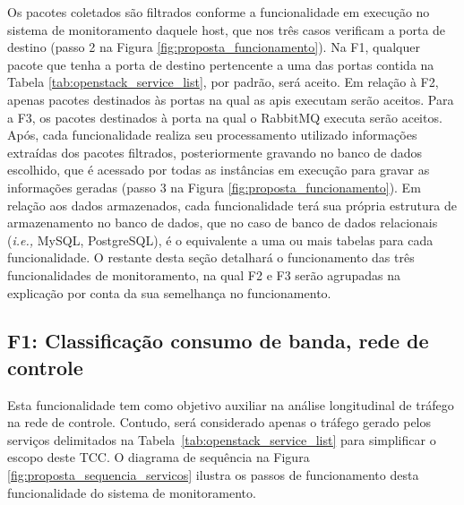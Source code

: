 Os pacotes coletados são filtrados conforme a funcionalidade em execução no sistema de monitoramento daquele host, que nos três casos verificam a porta de destino (passo 2 na Figura \ref{fig:proposta_funcionamento}).
%
Na F1, qualquer pacote que tenha a porta de destino pertencente a uma das portas contida na Tabela \ref{tab:openstack_service_list}, por padrão, será aceito.
%
Em relação à F2, apenas pacotes destinados às portas na qual as \acp{api} executam serão aceitos.
%
Para a F3, os pacotes destinados à porta na qual o RabbitMQ executa serão aceitos.
%
Após, cada funcionalidade realiza seu processamento utilizado informações extraídas dos pacotes filtrados, posteriormente gravando no banco de dados escolhido, que é acessado por todas as instâncias em execução para gravar as informações geradas (passo 3 na Figura \ref{fig:proposta_funcionamento}).
%
Em relação aos dados armazenados, cada funcionalidade terá sua própria estrutura de armazenamento no banco de dados, que no caso de banco de dados relacionais (\textit{i.e.,} MySQL, PostgreSQL), é o equivalente a uma ou mais tabelas para cada funcionalidade.
%
O restante desta seção detalhará o funcionamento das três funcionalidades de monitoramento, na qual F2 e F3 serão agrupadas na explicação por conta da sua semelhança no funcionamento.

\subsection{F1: Classificação consumo de banda, rede de controle}
Esta funcionalidade tem como objetivo auxiliar na análise longitudinal de tráfego na rede de controle.
%
Contudo, será considerado apenas o tráfego gerado pelos serviços delimitados na Tabela~\ref{tab:openstack_service_list} para simplificar o escopo deste TCC.
%
O diagrama de sequência na Figura \ref{fig:proposta_sequencia_servicos} ilustra os passos de funcionamento desta funcionalidade do sistema de monitoramento.

